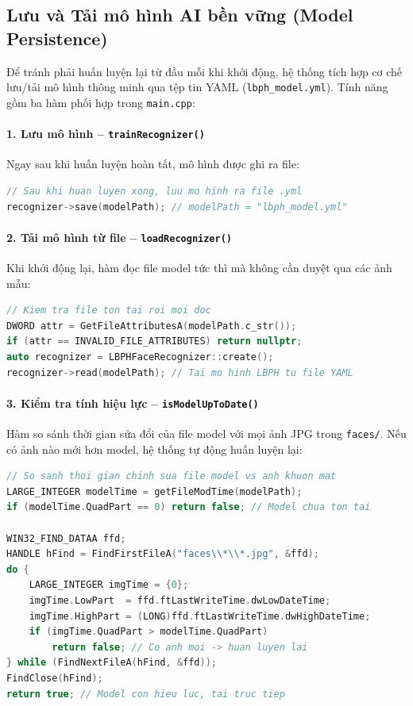 \documentclass[12pt,a4paper]{article}
\begin{document}
\subsection{Lưu và Tải mô hình AI bền vững (Model Persistence)}
Để tránh phải huấn luyện lại từ đầu mỗi khi khởi động, hệ thống tích hợp cơ chế lưu/tải mô hình thông minh qua tệp tin YAML (\texttt{lbph\_model.yml}). Tính năng gồm ba hàm phối hợp trong \texttt{main.cpp}:

\paragraph{1. Lưu mô hình – \texttt{trainRecognizer()}}
Ngay sau khi huấn luyện hoàn tất, mô hình được ghi ra file:
\begin{lstlisting}[language=C++]
// Sau khi huan luyen xong, luu mo hinh ra file .yml
recognizer->save(modelPath); // modelPath = "lbph_model.yml"
\end{lstlisting}

\paragraph{2. Tải mô hình từ file – \texttt{loadRecognizer()}}
Khi khởi động lại, hàm đọc file model tức thì mà không cần duyệt qua các ảnh mẫu:
\begin{lstlisting}[language=C++]
// Kiem tra file ton tai roi moi doc
DWORD attr = GetFileAttributesA(modelPath.c_str());
if (attr == INVALID_FILE_ATTRIBUTES) return nullptr;
auto recognizer = LBPHFaceRecognizer::create();
recognizer->read(modelPath); // Tai mo hinh LBPH tu file YAML
\end{lstlisting}

\paragraph{3. Kiểm tra tính hiệu lực – \texttt{isModelUpToDate()}}
Hàm so sánh thời gian sửa đổi của file model với mọi ảnh JPG trong \texttt{faces/}. Nếu có ảnh nào mới hơn model, hệ thống tự động huấn luyện lại:
\begin{lstlisting}[language=C++]
// So sanh thoi gian chinh sua file model vs anh khuon mat
LARGE_INTEGER modelTime = getFileModTime(modelPath);
if (modelTime.QuadPart == 0) return false; // Model chua ton tai

WIN32_FIND_DATAA ffd;
HANDLE hFind = FindFirstFileA("faces\\*\\*.jpg", &ffd);
do {
    LARGE_INTEGER imgTime = {0};
    imgTime.LowPart  = ffd.ftLastWriteTime.dwLowDateTime;
    imgTime.HighPart = (LONG)ffd.ftLastWriteTime.dwHighDateTime;
    if (imgTime.QuadPart > modelTime.QuadPart)
        return false; // Co anh moi -> huan luyen lai
} while (FindNextFileA(hFind, &ffd));
FindClose(hFind);
return true; // Model con hieu luc, tai truc tiep
\end{lstlisting}
\end{document}
